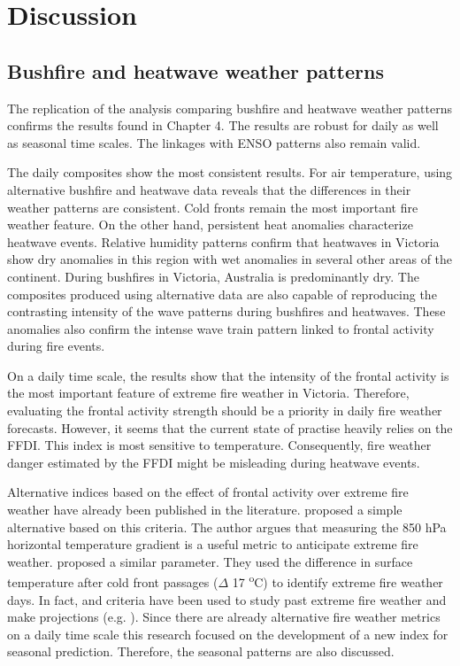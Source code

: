 \section{Discussion}


\subsection{Bushfire and heatwave weather patterns}

The replication of the analysis comparing bushfire and heatwave weather
patterns confirms the results found in Chapter 4. The results are
robust for daily as well as seasonal time scales. The linkages with
ENSO patterns also remain valid. 

The daily composites show the most consistent results. For air temperature,
using alternative bushfire and heatwave data reveals that the differences
in their weather patterns are consistent. Cold fronts remain the most
important fire weather feature. On the other hand, persistent heat
anomalies characterize heatwave events. Relative humidity patterns
confirm that heatwaves in Victoria show dry anomalies in this region
with wet anomalies in several other areas of the continent. During
bushfires in Victoria, Australia is predominantly dry. The composites
produced using alternative data are also capable of reproducing the
contrasting intensity of the wave patterns during bushfires and heatwaves.
These anomalies also confirm the intense wave train pattern linked
to frontal activity during fire events. 

On a daily time scale, the results show that the intensity of the
frontal activity is the most important feature of extreme fire weather
in Victoria. Therefore, evaluating the frontal activity strength should
be a priority in daily fire weather forecasts. However, it seems that
the current state of practise heavily relies on the FFDI. This index
is most sensitive to temperature. Consequently, fire weather danger
estimated by the FFDI might be misleading during heatwave events. 

Alternative indices based on the effect of frontal activity over extreme
fire weather have already been published in the literature. \citet{Mills2005}
proposed a simple alternative based on this criteria. The author argues
that measuring the 850 hPa horizontal temperature gradient is a useful
metric to anticipate extreme fire weather. \citet{Reeder2015} proposed
a similar parameter. They used the difference in surface temperature
after cold front passages (\ensuremath{\Delta} 17 \textsuperscript{o}C)
to identify extreme fire weather days. In fact, \citet{Mills2005}
and \citet{Reeder2015} criteria have been used to study past extreme
fire weather and make projections (e.g. \citet{Hasson2009}). Since
there are already alternative fire weather metrics on a daily time
scale this research focused on the development of a new index for
seasonal prediction. Therefore, the seasonal patterns are also discussed.

